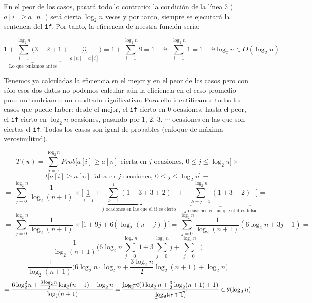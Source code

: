 \documentclass[10pt,a4paper,spanish]{report}
\begin{document}
En el peor de los casos, pasará todo lo contrario: la condición de la línea 3 ($a[i] \geq a[n]$) será cierta $\log_2 n$ veces y por tanto, siempre se ejecutará la sentencia del \verb*|if|. Por tanto, la eficiencia de nuestra función sería:

\begin{displaymath}
\underbrace{1 + \sum_{i=1}^{\log_2 n} (3 + 2 + 1}_{\textrm{Lo que teníamos antes}} + \underbrace{3}_{a[n]=a[i]}) = 1 + \sum_{i=1}^{\log_2 n} 9 = 1 + 9 \cdot \sum_{i=1}^{\log_2 n} 1 = 1 + 9\log_2 n \in O(\log_2 n)
\end{displaymath}

Tenemos ya calculadas la eficiencia en el mejor y en el peor de los casos pero con sólo esos dos datos no podemos calcular aún la eficiencia en el caso promedio pues no tendríamos un resultado significativo. Para ello identificamos todos los casos que puede haber: desde el mejor, el \verb*|if| cierto en 0 ocasiones, hasta el peor, el \verb*|if| cierto en $\log_2 n$ ocasiones, pasando por 1, 2, 3, $\cdots$ ocasiones en las que son ciertas el \verb*|if|. Todos los casos son igual de probables (enfoque de máxima verosimilitud).

\begin{displaymath}
T(n) = \sum_{j=0}^{\log_2 n} Prob \bigg[a[i] \geq a[n] \textrm{ cierta en $j$ ocasiones, $0 \leq j \leq \log_2 n$} \bigg] \times
\end{displaymath}
\begin{displaymath}
t \bigg[ a[i] \geq a[n] \textrm{ falsa en $j$ ocasiones, $0 \leq j \leq \log_2 n$} \bigg] = 
\end{displaymath}
\begin{displaymath}
= \sum_{j=0}^{\log_2 n} \frac{1}{\log_2 (n+1)} \times \Bigg[ \underbrace{1}_{i=1} + \underbrace{\sum_{k=1}^{j}(1+3+3+2)}_{\textrm{$j$ ocasiones en las que el if es cierto}} + \underbrace{\sum_{k=j+1}^{\log_2 n} (1+3+2)}_{\textrm{$j$ ocasiones en las que el if es falso}} \Bigg] =
\end{displaymath}
\begin{displaymath}
= \sum_{j=0}^{\log_2 n} \frac{1}{\log_2 (n+1)} \times \Bigg[ 1 + 9j + 6(\log_2 (n-j)) \Bigg] = \sum_{j=0}^{\log_2 n} \frac{1}{\log_2 (n+1)} (6 \log_2 n + 3j + 1) =
\end{displaymath}
\begin{displaymath}
= \frac{1}{\log_2 (n+1)} \Bigg( 6 \log_2 n  \sum_{j=0}^{\log_2 n} 1  + 3 \sum_{j=0}^{\log_2 n} j + \sum_{j=0}^{\log_2 n} 1 \Bigg) = 
\end{displaymath}
\begin{displaymath}
= \frac{1}{\log_2 (n+1)} \Bigg( 6 \log_2 n \cdot \log_2 n + \frac{3\log_2 n}{2}\log_2 (n+1) + \log_2 n \Bigg) = 
\end{displaymath}
\begin{displaymath}
= \frac{6 \log_2^2 n + \frac{3\log_2 n}{2}\log_2 (n+1) + \log_2 n}{\log_2 (n+1)} = \frac{\cancel{\log_2 n} (6\log_2 n + \frac{3}{2}\log_2 (n+1) + 1)}{\cancel{\log_2 (n+1)}} \in \theta(\log_2 n)
\end{displaymath}
\end{document}
